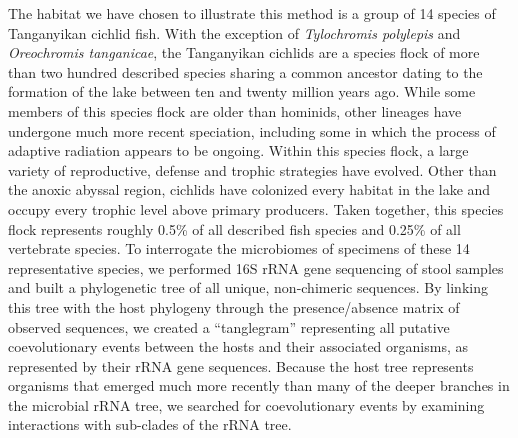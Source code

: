 The habitat we have chosen to illustrate this method is a group of 14 species of Tanganyikan cichlid fish. With the exception of {\em Tylochromis polylepis} and {\em Oreochromis tanganicae}, the Tanganyikan cichlids are a species flock of more than two hundred described species sharing a common ancestor dating to the formation of the lake between ten and twenty million years ago. While some members of this species flock are older than hominids, other lineages have undergone much more recent speciation, including some in which the process of adaptive radiation appears to be ongoing. Within this species flock, a large variety of reproductive, defense and trophic strategies have evolved. Other than the anoxic abyssal region, cichlids have colonized every habitat in the lake and occupy every trophic level above primary producers. Taken together, this species flock represents roughly 0.5\% of all described fish species and 0.25\% of all vertebrate species. To interrogate the microbiomes of specimens of these 14 representative species, we performed 16S rRNA gene sequencing of stool samples and built a phylogenetic tree of all unique, non-chimeric sequences. By linking this tree with the host phylogeny through the presence/absence matrix of observed sequences, we created a ``tanglegram'' representing all putative coevolutionary events between the hosts and their associated organisms, as represented by their rRNA gene sequences. Because the host tree represents organisms that emerged much more recently than many of the deeper branches in the microbial rRNA tree, we searched for coevolutionary events by examining interactions with sub-clades of the rRNA tree.
